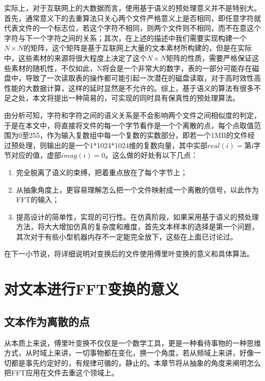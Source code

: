 实际上，对于互联网上的大数据而言，使用基于语义的预处理意义并不是特别大。首先，通常意义下的去重算法只关心两个文件严格意义上是否相同，即任意字符就代表文件的一个标志位，若这个字符不相同，则两个文件则不相同，而不在意这个字符与下一个字符之间的关系；其次，在上述的描述中我们需要实现构建一个$N \times N$的矩阵，这个矩阵是基于互联网上大量的文本素材所构建的，但是在实际中，这些素材的来源将很大程度上决定了这个$N \times N$矩阵的性质，需要严格保证这些素材的随机性，不仅如此，N将会是一个非常大的数字，表的一部分可能存在磁盘中，导致了一次读取表的操作都可能引起一次潜在的磁盘读取，对于高时效性高性能的大数据计算，这样的延时显然是不允许的。综上，基于语义的算法有很多不足之处，本文将提出一种简易的，可实现的同时具有保真性的预处理算法。

由分析可知，字符和字符之间的语义关系是不会影响两个文件之间相似度的判定，于是在本文中，将直接将文件的每一个字节看作是一个个离散的点，每个点取值范围为0至255，作为输入复数组中每一个复数的实数部分，即若一个1MB的文件经过预处理，则输出的是一个1*1024*1024维的复数向量，其中实部$real(i)=$第i字节对应的值，虚部$imag(i)=0$。这么做的好处有以下几点：

\begin{enumerate}
\item 完全脱离了语义的束缚，把着重点放在了每个字节上；
\item 从抽象角度上，更容易理解怎么把一个文件映射成一个离散的信号，以此作为FFT的输入；
\item 提高设计的简单性，实现的可行性。在仿真阶段，如果采用基于语义的预处理方法，将大大增加仿真的复杂度和难度，首先文本样本的选择是第一个问题，其次对于有些小型机器内存不一定能完全放下，这些在上面已讨论过。
\end{enumerate}

在下一小节说，将详细说明对变换后的文件使用傅里叶变换的意义和具体算法。

\section{对文本进行FFT变换的意义}
\label{sec:ffttr}

\subsection{文本作为离散的点}
从本质上来说，傅里叶变换不仅仅是一个数学工具，更是一种看待事物的一种思维方式，从时域上来讲，一切事物都在变化，换一个角度，若从频域上来讲，好像一切都是事先约定好的，有规律可循的，静止的。本章节将从抽象的角度来阐明怎么把FFT应用在文件去重这个领域上。

